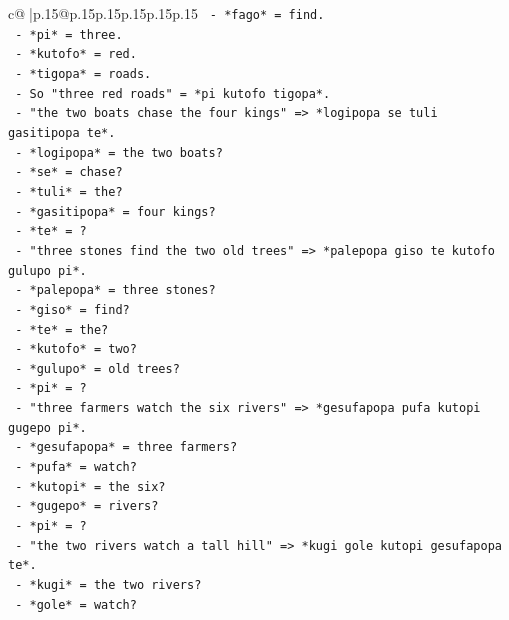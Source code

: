 \documentclass{article}
\begin{document}
{\begin{supertabular}{c@{$\;$}|p{.15\linewidth}@{}p{.15\linewidth}p{.15\linewidth}p{.15\linewidth}p{.15\linewidth}p{.15\linewidth}}
{{{\texttt{              {-} *fago* = find.} \\
\texttt{              {-} *pi* = three.} \\
\texttt{              {-} *kutofo* = red.} \\
\texttt{              {-} *tigopa* = roads.} \\
\texttt{              {-} So "three red roads" = *pi kutofo tigopa*.} \\
\texttt{            {-} "the two boats chase the four kings" => *logipopa se tuli gasitipopa te*.} \\
\texttt{              {-} *logipopa* = the two boats?} \\
\texttt{              {-} *se* = chase?} \\
\texttt{              {-} *tuli* = the?} \\
\texttt{              {-} *gasitipopa* = four kings?} \\
\texttt{              {-} *te* = ?} \\
\texttt{            {-} "three stones find the two old trees" => *palepopa giso te kutofo gulupo pi*.} \\
\texttt{              {-} *palepopa* = three stones?} \\
\texttt{              {-} *giso* = find?} \\
\texttt{              {-} *te* = the?} \\
\texttt{              {-} *kutofo* = two?} \\
\texttt{              {-} *gulupo* = old trees?} \\
\texttt{              {-} *pi* = ?} \\
\texttt{            {-} "three farmers watch the six rivers" => *gesufapopa pufa kutopi gugepo pi*.} \\
\texttt{              {-} *gesufapopa* = three farmers?} \\
\texttt{              {-} *pufa* = watch?} \\
\texttt{              {-} *kutopi* = the six?} \\
\texttt{              {-} *gugepo* = rivers?} \\
\texttt{              {-} *pi* = ?} \\
\texttt{            {-} "the two rivers watch a tall hill" => *kugi gole kutopi gesufapopa te*.} \\
\texttt{              {-} *kugi* = the two rivers?} \\
\texttt{              {-} *gole* = watch?} \\
}}}
\end{supertabular}}
\end{document}
